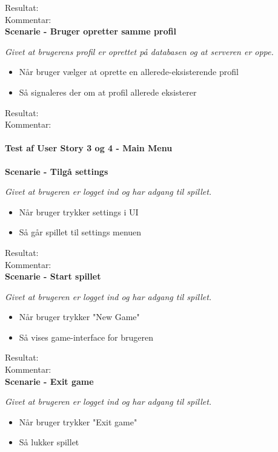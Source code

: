 Resultat:\\
Kommentar:\\

\bf{Scenarie - Bruger opretter samme profil}

\it{Givet at brugerens profil er oprettet på databasen og at serveren er oppe.}

\begin{itemize}
  \item Når bruger vælger at oprette en allerede-eksisterende profil
  \item Så signaleres der om at profil allerede eksisterer
\end{itemize}

Resultat:\\
Kommentar:\\

\paragraph{Test af User Story 3 og 4 - Main Menu}

\bf{Scenarie - Tilgå settings}

\it{Givet at brugeren er logget ind og har adgang til spillet.}

\begin{itemize}
  \item Når bruger trykker settings i UI
  \item Så går spillet til settings menuen
\end{itemize}

Resultat:\\
Kommentar:\\

\bf{Scenarie - Start spillet}

\it{Givet at brugeren er logget ind og har adgang til spillet.}

\begin{itemize}
  \item Når bruger trykker "New Game"
  \item Så vises game-interface for brugeren
\end{itemize}

Resultat:\\
Kommentar:\\

\bf{Scenarie - Exit game}

\it{Givet at brugeren er logget ind og har adgang til spillet.}

\begin{itemize}
  \item Når bruger trykker "Exit game"
  \item Så lukker spillet
\end{itemize}

